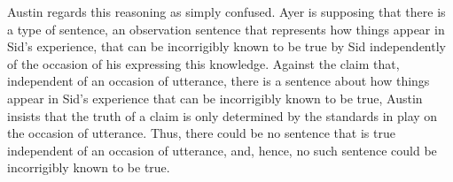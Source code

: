 Austin regards this reasoning as simply confused. Ayer is supposing that there is a type of sentence, an observation sentence that represents how things appear in Sid's experience, that can be incorrigibly known to be true by Sid independently of the occasion of his expressing this knowledge.  Against the claim that, independent of an occasion of utterance, there is a sentence about how things appear in Sid's experience that can be incorrigibly known to be true, Austin insists that the truth of a claim is only determined by the standards in play on the occasion of utterance.%
Thus, there could be no sentence that is true independent of an occasion of utterance, and, hence, no such sentence could be incorrigibly known to be true.

